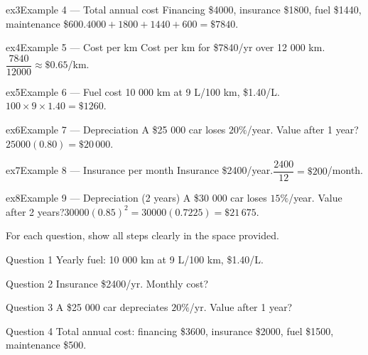 \documentclass[11pt]{article}
\begin{document}
\begin{example}{ex3}{Example 4 --- Total annual cost}
Financing \$4000, insurance \$1800, fuel \$1440, maintenance \$600.\soln $4000+1800+1440+600=\$7840$.
\end{example}

\begin{example}{ex4}{Example 5 --- Cost per km}
Cost per km for \$7840/yr over 12 000 km.\soln $\dfrac{7840}{12000}\approx\$0.65$/km.
\end{example}

\begin{example}{ex5}{Example 6 --- Fuel cost}
10 000 km at 9 L/100 km, \$1.40/L.\soln $100\times9\times1.40=\$1260$.
\end{example}

\begin{example}{ex6}{Example 7 --- Depreciation}
A \$25 000 car loses $20\%$/year. Value after 1 year?\soln $25000(0.80)=\$20\,000$.
\end{example}

\begin{example}{ex7}{Example 8 --- Insurance per month}
Insurance \$2400/year.\soln $\dfrac{2400}{12}=\$200$/month.
\end{example}

\begin{example}{ex8}{Example 9 --- Depreciation (2 years)}
A \$30 000 car loses $15\%$/year. Value after 2 years?\soln $30000(0.85)^2=30000(0.7225)=\$21\,675$.
\end{example}

\clearpage
{}
For each question, show all steps clearly in the space provided.

\begin{qbox}{Question 1}
Yearly fuel: 10 000 km at 9 L/100 km, \$1.40/L.\workspace{2.4cm}
\end{qbox}

\begin{qbox}{Question 2}
Insurance \$2400/yr. Monthly cost?\workspace{2.4cm}
\end{qbox}

\begin{qbox}{Question 3}
A \$25 000 car depreciates $20\%$/yr. Value after 1 year?\workspace{2.4cm}
\end{qbox}

\begin{qbox}{Question 4}
Total annual cost: financing \$3600, insurance \$2000, fuel \$1500, maintenance \$500.\workspace{2.4cm}
\end{qbox}
\end{document}
